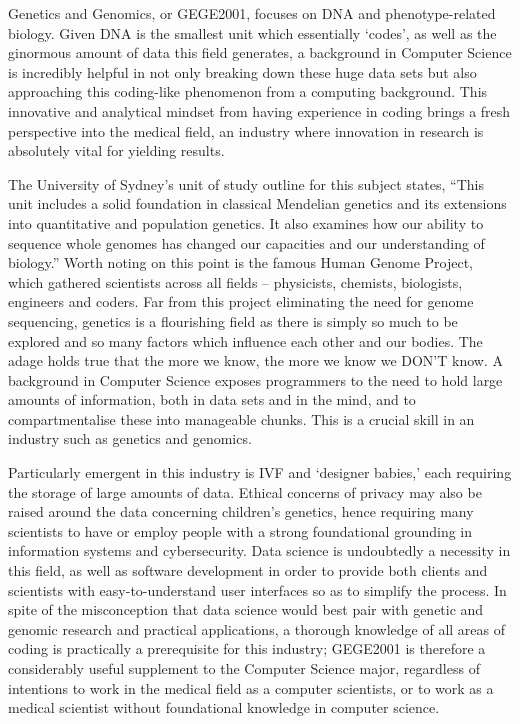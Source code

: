 Genetics and Genomics, or GEGE2001, focuses on DNA and phenotype-related biology. Given DNA is the smallest unit which essentially ‘codes’, as well as the ginormous amount of data this field generates, a background in Computer Science is incredibly helpful in not only breaking down these huge data sets but also approaching this coding-like phenomenon from a computing background. This innovative and analytical mindset from having experience in coding brings a fresh perspective into the medical field, an industry where innovation in research is absolutely vital for yielding results.

The University of Sydney’s unit of study outline for this subject states, “This unit includes a solid foundation in classical Mendelian genetics and its extensions into quantitative and population genetics. It also examines how our ability to sequence whole genomes has changed our capacities and our understanding of biology.” Worth noting on this point is the famous Human Genome Project, which gathered scientists across all fields – physicists, chemists, biologists, engineers and coders. Far from this project eliminating the need for genome sequencing, genetics is a flourishing field as there is simply so much to be explored and so many factors which influence each other and our bodies. The adage holds true that the more we know, the more we know we DON’T know. A background in Computer Science exposes programmers to the need to hold large amounts of information, both in data sets and in the mind, and to compartmentalise these into manageable chunks. This is a crucial skill in an industry such as genetics and genomics.

Particularly emergent in this industry is IVF and ‘designer babies,’ each requiring the storage of large amounts of data. Ethical concerns of privacy may also be raised around the data concerning children’s genetics, hence requiring many scientists to have or employ people with a strong foundational grounding in information systems and cybersecurity. Data science is undoubtedly a necessity in this field, as well as software development in order to provide both clients and scientists with easy-to-understand user interfaces so as to simplify the process. In spite of the misconception that data science would best pair with genetic and genomic research and practical applications, a thorough knowledge of all areas of coding is practically a prerequisite for this industry; GEGE2001 is therefore a considerably useful supplement to the Computer Science major, regardless of intentions to work in the medical field as a computer scientists, or to work as a medical scientist without foundational knowledge in computer science.

